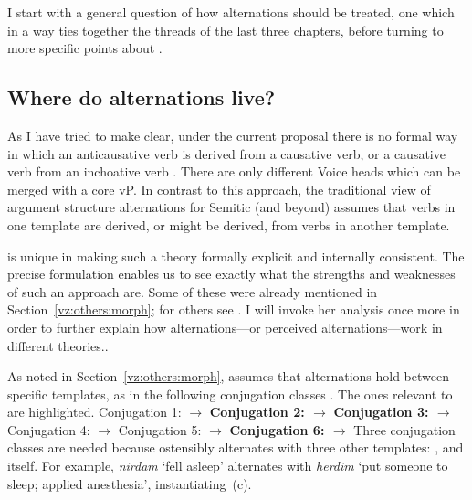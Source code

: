 I start with a general question of how alternations should be treated, one which in a way ties together the threads of the last three chapters, before turning to more specific points about {\thif}.
	
	\subsection{Where do alternations live?} \label{vd:others:arad}
As I have tried to make clear, under the current proposal there is no formal way in which an anticausative verb is derived from a causative verb, or a causative verb from an inchoative verb \citep{schaefer08}. There are only different Voice heads which can be merged with a core vP. In contrast to this approach, the traditional view of argument structure alternations for Semitic (and beyond) assumes that verbs in one template are derived, or might be derived, from verbs in another template.

\cite{arad05} is unique in making such a theory formally explicit and internally consistent. The precise formulation enables us to see exactly what the strengths and weaknesses of such an approach are. Some of these were already mentioned in Section~\ref{vz:others:morph}; for others see \cite{kastnertucker19cup}. I will invoke her analysis once more in order to further explain how alternations---or perceived alternations---work in different theories..

As noted in Section~\ref{vz:others:morph}, \cite{arad05} assumes that alternations hold between specific templates, as in the following conjugation classes \cite[226]{arad05}. The ones relevant to {\thif} are highlighted.
\pex
	\a Conjugation 1: {\tnif} $\rightarrow$ {\tkal}
	\a \textbf{Conjugation 2: {\tkal} $\rightarrow$ {\thif}}
	\a \textbf{Conjugation 3: {\tnif} $\rightarrow$ {\thif}}
	\a Conjugation 4: {\thit} $\rightarrow$ {\tpie}
	\a Conjugation 5: {\thit} $\rightarrow$ {\tpie}
	\a \textbf{Conjugation 6: {\thif} $\rightarrow$ {\thif}}
\xe
Three conjugation classes are needed because {\thif} ostensibly alternates with three other templates: {\tkal}, {\tnif} and {\thif} itself. For example, \emph{nirdam} `fell asleep' alternates with \emph{herdim} `put someone to sleep; applied anesthesia', instantiating~(\lastx c).

